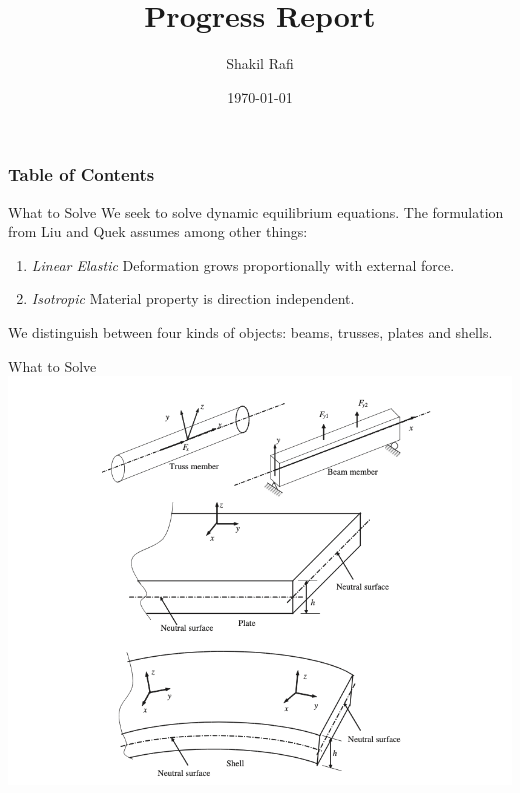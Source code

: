 \documentclass{beamer}
\title[Short title]{Progress Report}
\author{Shakil Rafi}
\institute[University of Arkansas] 
{
University of Arkansas \\ 
\medskip
}
\date{\today}
\begin{document}
\nocite{*}
\begin{frame}
\titlepage 
\end{frame}

\begin{frame}
\frametitle{Table of Contents} 
    \tableofcontents 
\end{frame}
\begin{frame}{What to Solve}
    We seek to solve dynamic equilibrium equations. The formulation from Liu and Quek assumes among other things:
    \begin{enumerate}
        \item \textit{Linear Elastic} Deformation grows proportionally with external force.
        \item \textit{Isotropic} Material property is direction independent.
    \end{enumerate}
    We distinguish between four kinds of objects: beams, trusses, plates and shells.
\end{frame}
\begin{frame}{What to Solve}
    \includegraphics[scale = 0.35]{TypesOfObjects.png}
\end{frame}
\end{document}
